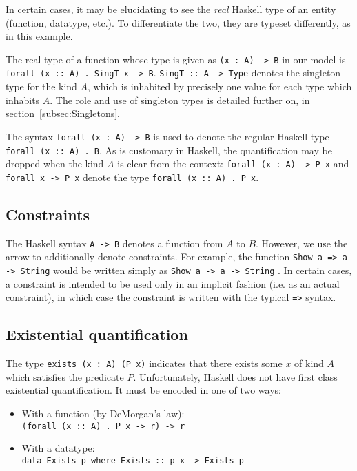 In certain cases, it may be elucidating to see the \emph{real} Haskell type of
an entity (function, datatype, etc.). To differentiate the two, they are typeset
differently, as in this example.

The real type of a function whose type is given as \lstinline!(x : A) -> B! in
our model is \texttt{forall (x :: A) . SingT x -> B}. \texttt{SingT :: A -> 
Type}
denotes the singleton type for the kind $A$, which is inhabited by precisely
one value for each type which inhabits $A$. The role and use of singleton types
is detailed further on, in section~\ref{subsec:Singletons}. 

The syntax \lstinline!forall (x : A) -> B! is used to denote the regular
Haskell type \texttt{forall (x :: A) . B}. As is customary in Haskell, the 
quantification
may be dropped when the kind $A$ is clear from the context: 
\lstinline!forall (x : A) -> P x! 
and
\lstinline!forall x -> P x! denote the type \texttt{forall (x :: A) . P x}.

\subsection*{Constraints}

The Haskell syntax \texttt{A -> B} denotes a function from $A$ to $B$. However,
we use the arrow to additionally denote constraints. For example, the function
\texttt{Show a => a -> String} would be written simply as 
\lstinline!Show a -> a -> String!
.
In certain cases, a constraint is intended to be used only in an implicit 
fashion 
(i.e. as an actual constraint), in which case the constraint is written with 
the typical \lstinline{=>} syntax. 

\subsection*{Existential quantification}

The type \lstinline!exists (x : A) (P x)! indicates that there exists some $x$
of kind $A$ which satisfies the predicate $P$. Unfortunately, Haskell does not
have first class existential quantification. It must be encoded in one of
two ways:


\begin{itemize}
    \item With a function (by DeMorgan's law): \\ \texttt{(forall (x :: A) . P 
    x -> r) -> r}
    \item With a datatype: \\ \texttt{data Exists p where Exists :: p x -> 
    Exists p}
\end{itemize} 

